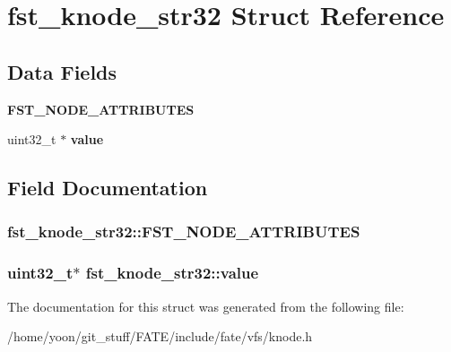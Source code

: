 \hypertarget{structfst__knode__str32}{\section{fst\-\_\-knode\-\_\-str32 Struct Reference}
\label{structfst__knode__str32}
}
\subsection*{Data Fields}
\begin{DoxyCompactItemize}
\item 
\hypertarget{structfst__knode__str32_a46173fa20855a50a1e385b74b4abadd8}{{\bfseries F\-S\-T\-\_\-\-N\-O\-D\-E\-\_\-\-A\-T\-T\-R\-I\-B\-U\-T\-E\-S}}\label{structfst__knode__str32_a46173fa20855a50a1e385b74b4abadd8}

\item 
\hypertarget{structfst__knode__str32_ae901745080418e79476e0035a9a92149}{uint32\-\_\-t $\ast$ {\bfseries value}}\label{structfst__knode__str32_ae901745080418e79476e0035a9a92149}

\end{DoxyCompactItemize}


\subsection{Field Documentation}
\hypertarget{structfst__knode__str32_a46173fa20855a50a1e385b74b4abadd8}{
\subsubsection[{F\-S\-T\-\_\-\-N\-O\-D\-E\-\_\-\-A\-T\-T\-R\-I\-B\-U\-T\-E\-S}]{\setlength{\rightskip}{0pt plus 5cm}fst\-\_\-knode\-\_\-str32\-::\-F\-S\-T\-\_\-\-N\-O\-D\-E\-\_\-\-A\-T\-T\-R\-I\-B\-U\-T\-E\-S}}\label{structfst__knode__str32_a46173fa20855a50a1e385b74b4abadd8}
\hypertarget{structfst__knode__str32_ae901745080418e79476e0035a9a92149}{
\subsubsection[{value}]{\setlength{\rightskip}{0pt plus 5cm}uint32\-\_\-t$\ast$ fst\-\_\-knode\-\_\-str32\-::value}}\label{structfst__knode__str32_ae901745080418e79476e0035a9a92149}


The documentation for this struct was generated from the following file\-:\begin{DoxyCompactItemize}
\item 
/home/yoon/git\-\_\-stuff/\-F\-A\-T\-E/include/fate/vfs/knode.\-h\end{DoxyCompactItemize}
